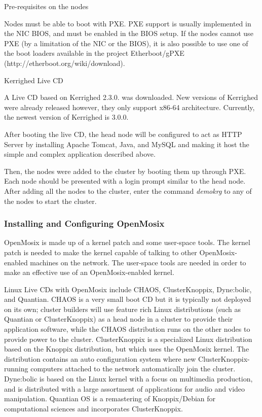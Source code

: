 \documentclass[preprint]{acm_proc_article-sp}
\begin{document}
Pre-requisites on the nodes

Nodes must be able to boot with PXE. PXE support is usually implemented in the NIC BIOS, and must be enabled in the BIOS setup. If the nodes cannot use PXE (by a limitation of the NIC or the BIOS), it is also possible to use one of the boot loaders available in the project Etherboot/gPXE (http://etherboot.org/wiki/download). 

Kerrighed Live CD

A Live CD based on Kerrighed 2.3.0. was downloaded. New versions of Kerrighed were already released however, they only support x86-64 architecture. Currently, the newest version of Kerrighed is 3.0.0. 

After booting the live CD, the head node will be configured to act as HTTP Server by installing Apache Tomcat, Java, and MySQL and making it host the simple and complex application described above.

Then, the nodes were added to the cluster by booting them up through PXE. Each node should be presented with a login prompt similar to the head node. After adding all the nodes to the cluster, enter the command \emph{demokrg} to any of the nodes to start the cluster.

\subsubsection{Installing and Configuring OpenMosix}

OpenMosix is made up of a kernel patch and some user-space tools. The kernel patch is needed to make the kernel capable of talking to other OpenMosix-enabled machines on the network. The user-space tools are needed in order to make an effective use of an OpenMosix-enabled kernel.
 
Linux Live CDs with OpenMosix include CHAOS, ClusterKnoppix, Dyne:bolic, and Quantian. CHAOS is a very small boot CD but it is typically not deployed on its own; cluster builders will use feature rich Linux distributions (such as Quantian or ClusterKnoppix) as a head node in a cluster to provide their application software, while the CHAOS distribution runs on the other nodes to provide power to the cluster. ClusterKnoppix is a specialized Linux distribution based on the Knoppix distribution, but which uses the OpenMosix kernel. The distribution contains an auto configuration system where new ClusterKnoppix-running computers attached to the network automatically join the cluster. Dyne:bolic is based on the Linux kernel with a focus on multimedia production, and is distributed with a large assortment of applications for audio and video manipulation. Quantian OS is a remastering of Knoppix/Debian for computational sciences and incorporates ClusterKnoppix. 
\end{document}
